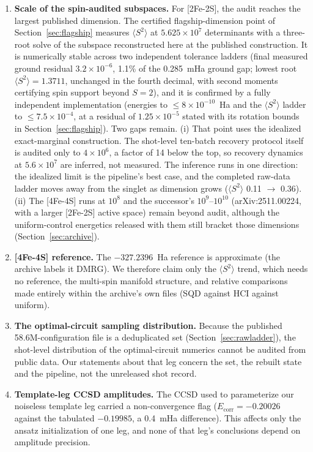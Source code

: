 \documentclass[11pt]{article}
\newcommand{\ssq}{\ensuremath{\langle S^2\rangle}}
\begin{document}
\begin{enumerate}
\item \textbf{Scale of the spin-audited subspaces.} For [2Fe-2S], the audit reaches the largest published dimension. The certified flagship-dimension point of Section~\ref{sec:flagship} measures \ssq{} at $5.625\times10^7$ determinants with a three-root solve of the subspace reconstructed here at the published construction. It is numerically stable across two independent tolerance ladders (final measured ground residual $3.2\times10^{-6}$, 1.1\% of the 0.285~mHa ground gap; lowest root $\ssq = 1.3711$, unchanged in the fourth decimal, with second moments certifying spin support beyond $S = 2$), and it is confirmed by a fully independent implementation (energies to $\le8\times10^{-10}$~Ha and the \ssq{} ladder to $\le7.5\times10^{-4}$, at a residual of $1.25\times10^{-5}$ stated with its rotation bounds in Section~\ref{sec:flagship}). Two gaps remain. (i) That point uses the idealized exact-marginal construction. The shot-level ten-batch recovery protocol itself is audited only to $4\times10^6$, a factor of 14 below the top, so recovery dynamics at $5.6\times10^7$ are inferred, not measured. The inference runs in one direction: the idealized limit is the pipeline's best case, and the completed raw-data ladder moves away from the singlet as dimension grows (\ssq{} 0.11 $\to$ 0.36). (ii) The [4Fe-4S] runs at $10^8$ and the successor's $10^{9}$--$10^{10}$ (arXiv:2511.00224, with a larger [2Fe-2S] active space) remain beyond audit, although the uniform-control energetics released with them still bracket those dimensions (Section~\ref{sec:archive}).
\item \textbf{[4Fe-4S] reference.} The $-327.2396$~Ha reference is approximate (the archive labels it DMRG). We therefore claim only the \ssq{} trend, which needs no reference, the multi-spin manifold structure, and relative comparisons made entirely within the archive's own files (SQD against HCI against uniform).
\item \textbf{The optimal-circuit sampling distribution.} Because the published 58.6M-configuration file is a deduplicated set (Section~\ref{sec:rawladder}), the shot-level distribution of the optimal-circuit numerics cannot be audited from public data. Our statements about that leg concern the set, the rebuilt state and the pipeline, not the unreleased shot record.
\item \textbf{Template-leg CCSD amplitudes.} The CCSD used to parameterize our noiseless template leg carried a non-convergence flag ($E_{\text{corr}} = -0.20026$ against the tabulated $-0.19985$, a 0.4~mHa difference). This affects only the ansatz initialization of one leg, and none of that leg's conclusions depend on amplitude precision.

\end{enumerate}
\end{document}
